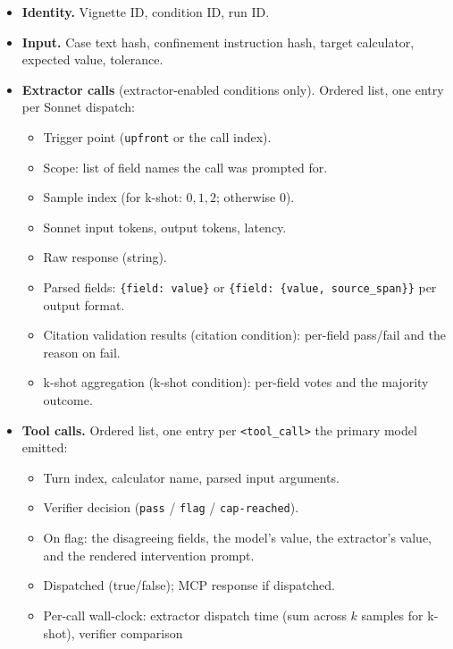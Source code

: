 \begin{itemize}\setlength\itemsep{2pt}
  \item \textbf{Identity.} Vignette ID, condition ID, run ID.
  \item \textbf{Input.} Case text hash, confinement instruction hash,
        target calculator, expected value, tolerance.
  \item \textbf{Extractor calls} (extractor-enabled conditions only).
        Ordered list, one entry per Sonnet dispatch:
        \begin{itemize}
          \item Trigger point (\texttt{upfront} or the
                 call index).
          \item Scope: list of field names the call was prompted for.
          \item Sample index (for k-shot: $0, 1, 2$; otherwise $0$).
          \item Sonnet input tokens, output tokens, latency.
          \item Raw response (string).
          \item Parsed fields: \texttt{\{field: value\}} or
                \texttt{\{field: \{value, source\_span\}\}} per
                output format.
          \item Citation validation results (citation condition):
                per-field pass/fail and the reason on fail.
          \item k-shot aggregation (k-shot condition): per-field
                votes and the majority outcome.
        \end{itemize}
  \item \textbf{Tool calls.} Ordered list, one entry per
        \verb|<tool_call>| the primary model emitted:
        \begin{itemize}
          \item Turn index, calculator name, parsed input arguments.
          \item Verifier decision (\texttt{pass} /
                \texttt{flag} / \texttt{cap-reached}).
          \item On flag: the disagreeing fields, the model's value,
                the extractor's value, and the rendered intervention
                prompt.
          \item Dispatched (true/false); MCP response if dispatched.
          \item Per-call wall-clock: extractor dispatch time (sum
                across $k$ samples for k-shot), verifier comparison

\end{itemize}
\end{itemize}
